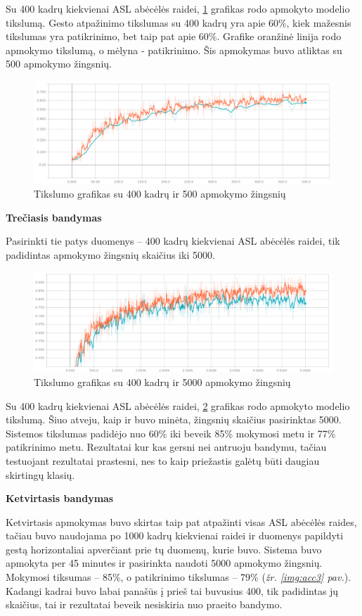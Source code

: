 \documentclass{VUMIFInfKursinis}
\begin{document}
Su 400 kadrų kiekvienai ASL abėcėlės raidei, \ref{img:acc} grafikas rodo apmokyto modelio tikslumą. Gesto atpažinimo tikslumas su 400 kadrų yra apie 60\%, kiek mažesnis tikslumas yra patikrinimo, bet taip pat apie 60\%. Grafike oranžinė linija rodo apmokymo tikslumą, o mėlyna - patikrinimo. Šis apmokymas buvo atliktas su 500 apmokymo žingsnių.

\begin{figure}[H]
	\centering
	\includegraphics[width=.8\linewidth]{img/accuracy}
	\caption{Tikslumo grafikas su 400 kadrų ir 500 apmokymo žingsnių}
	\label{img:acc}
\end{figure}


\textbf{Trečiasis bandymas}

Pasirinkti tie patys duomenys – 400 kadrų kiekvienai ASL abėcėlės raidei, tik padidintas apmokymo žingsnių skaičius iki 5000.

\begin{figure}[H]
	\centering
	\includegraphics[width=.8\linewidth]{img/accuracy2}
	\caption{Tikslumo grafikas su 400 kadrų ir 5000 apmokymo žingsnių}
	\label{img:acc2}
\end{figure}

Su 400 kadrų kiekvienai ASL abėcėlės raidei, \ref{img:acc2} grafikas rodo apmokyto modelio tikslumą. Šiuo atveju, kaip ir buvo minėta, žingsnių skaičius pasirinktas 5000. Sistemos tikslumas padidėjo nuo 60\% iki beveik 85\% mokymosi metu ir 77\% patikrinimo metu. Rezultatai kur kas gersni nei antruoju bandymu, tačiau testuojant rezultatai prastesni, nes to kaip priežastis galėtų būti daugiau skirtingų klasių.

\textbf{Ketvirtasis bandymas}

Ketvirtasis apmokymas buvo skirtas taip pat atpažinti visas ASL abėcėlės raides, tačiau buvo naudojama po 1000 kadrų kiekvienai raidei ir duomenys papildyti gestą horizontaliai apverčiant prie tų duomenų, kurie buvo. Sistema buvo apmokyta per 45 minutes ir pasirinkta naudoti 5000 apmokymo žingsnių. Mokymosi tiksumas – 85\%, o patikrinimo tikslumas – 79\% (\textit{žr. \ref{img:acc3} pav.}). Kadangi kadrai buvo labai panašūs į prieš tai buvusius 400, tik padidintas jų skaičius, tai ir rezultatai beveik nesiskiria nuo praeito bandymo.
\end{document}
